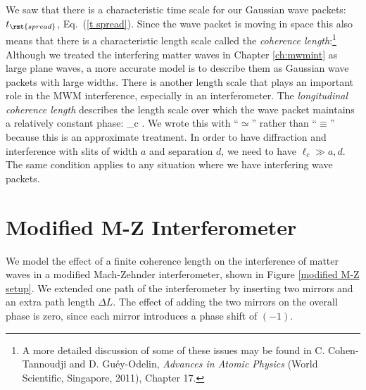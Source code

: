 We saw that there is a characteristic time scale for our Gaussian wave packets: $t_\rmt{spread}$, Eq.~(\ref{t spread}). Since the wave packet is moving in space this also means that there is a characteristic length scale called the {\em coherence length}:\footnote{A more detailed discussion of some of these issues may be found in C. Cohen-Tannoudji and D. Gu\'{e}y-Odelin, {\em Advances in Atomic Physics} (World Scientific, Singapore, 2011), Chapter 17.} Although we treated the interfering matter waves in Chapter \ref{ch:mwmint} as large plane waves, a more accurate model is to describe them as Gaussian wave packets with large widths. There is another length scale that plays an important role in the MWM interference, especially in an interferometer. The {\em longitudinal coherence length} describes the length scale over which the wave packet maintains a relatively constant phase:
\beq
\ell_{c} \simeq  {}.
\eeq
We wrote this with ``$\simeq$'' rather than ``$\equiv$'' because this is an approximate treatment. In order  to have diffraction and interference with slits of width $a$ and separation $d$, we need to have $\ell_{c} \gg a, d$. The same condition applies to any situation where we have interfering wave packets.


\section{Modified M-Z Interferometer}

We model the effect of a finite coherence length on the interference of matter waves in a modified Mach-Zehnder interferometer, shown in Figure \ref{modified M-Z setup}. We extended one path of the interferometer by inserting two mirrors and an extra path length $\Delta L$. The effect of adding the two mirrors on the overall phase is zero, since each mirror introduces a phase shift of $(-1)$. 

